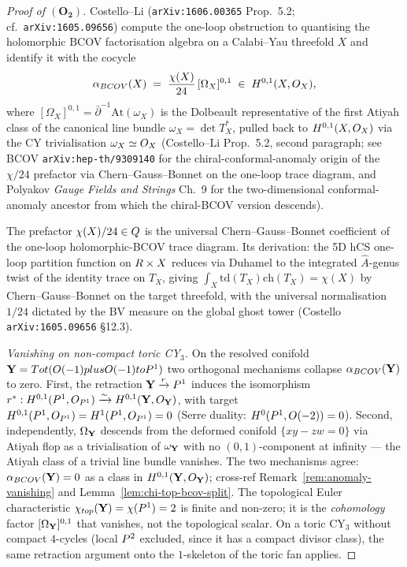 \begin{proof}[Proof of $(\mathbf{O_2})$]
Costello--Li (\texttt{arXiv:1606.00365} Prop.~5.2; cf.\
\texttt{arXiv:1605.09656}) compute the one-loop obstruction to
quantising the holomorphic BCOV factorisation algebra on a Calabi--Yau
threefold $X$ and identify it with the cocycle
\[
  \alpha_{BCOV}(X) \;=\; \frac{\chi(X)}{24}\,
  [\Omega_X]^{0,1} \;\in\; H^{0,1}(X, O_X),
\]
where $[\Omega_X]^{0,1} = \bar\partial^{-1}\mathrm{At}(\omega_X)$ is
the Dolbeault representative of the first Atiyah class of the
canonical line bundle $\omega_X = \det T_X^\ast$, pulled back to
$H^{0,1}(X, O_X)$ via the CY trivialisation $\omega_X \simeq O_X$
(Costello--Li Prop.~5.2, second paragraph; see BCOV
\texttt{arXiv:hep-th/9309140} for the chiral-conformal-anomaly origin
of the $\chi/24$ prefactor via Chern--Gauss--Bonnet on the one-loop
trace diagram, and Polyakov \emph{Gauge Fields and Strings} Ch.~9 for
the two-dimensional conformal-anomaly ancestor from which the
chiral-BCOV version descends).

The prefactor $\chi(X)/24 \in Q$ is the universal
Chern--Gauss--Bonnet coefficient of the one-loop holomorphic-BCOV
trace diagram. Its derivation: the 5D hCS one-loop partition function
on $R \times X$ reduces via Duhamel to the integrated
$\widehat A$-genus twist of the identity trace on $T_X$, giving
$\int_X \mathrm{td}(T_X) \mathrm{ch}(T_X) = \chi(X)$ by
Chern--Gauss--Bonnet on the target threefold, with the universal
normalisation $1/24$ dictated by the BV measure on the global ghost
tower (Costello \texttt{arXiv:1605.09656} \S 12.3).

\emph{Vanishing on non-compact toric CY$_3$.} On the resolved conifold
$\mathbf{Y} = Tot(O(-1)plusO(-1) toP^1)$ two orthogonal
mechanisms collapse $\alpha_{BCOV}(\mathbf{Y})$ to zero. First, the
retraction $\mathbf{Y} \xrightarrow{r} P^1$ induces the isomorphism
$r^\ast: H^{0,1}(P^1, O_{P^1}) \xrightarrow{\sim}
H^{0,1}(\mathbf{Y}, O_{\mathbf{Y}})$, with target
$H^{0,1}(P^1, O_{P^1}) = H^1(P^1, O_{P^1}) = 0$
(Serre duality: $H^0(P^1, O(-2)) = 0$). Second, independently,
$\Omega_{\mathbf{Y}}$ descends from the deformed conifold $\{xy - zw = 0\}$
via Atiyah flop as a trivialisation of $\omega_{\mathbf{Y}}$ with no
$(0,1)$-component at infinity --- the Atiyah class of a trivial line
bundle vanishes. The two mechanisms agree:
$\alpha_{BCOV}(\mathbf{Y}) = 0$ as a class in $H^{0,1}(\mathbf{Y}, O_{\mathbf{Y}})$;
cross-ref Remark~\ref{rem:anomaly-vanishing} and
Lemma~\ref{lem:chi-top-bcov-split}. The topological Euler
characteristic $\chi_{top}(\mathbf{Y}) = \chi(P^1) = 2$ is finite
and non-zero; it is the \emph{cohomology} factor $[\Omega_{\mathbf{Y}}]^{0,1}$
that vanishes, not the topological scalar. On a toric CY$_3$ without
compact $4$-cycles (local $P^2$ excluded, since it has a compact
divisor class), the same retraction argument onto the $1$-skeleton of
the toric fan applies.


\end{proof}
